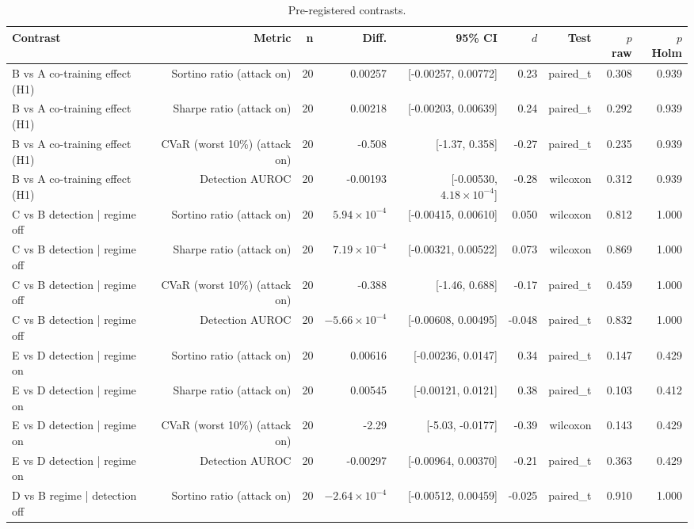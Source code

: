 \begin{table}[htbp]
  \centering
  \caption{Pre-registered contrasts.}
  \label{tab:contrasts}
  \begin{tabular}{lrrrrrrrr}
    \toprule
    Contrast & Metric & n & Diff. & 95\% CI & $d$ & Test & $p$ raw & $p$ Holm \\
    \midrule
    B vs A   co-training effect (H1) & Sortino ratio (attack on) & 20 & 0.00257 & [-0.00257, 0.00772] & 0.23 & paired\_t & 0.308 & 0.939 \\
    B vs A   co-training effect (H1) & Sharpe ratio (attack on) & 20 & 0.00218 & [-0.00203, 0.00639] & 0.24 & paired\_t & 0.292 & 0.939 \\
    B vs A   co-training effect (H1) & CVaR (worst 10\%) (attack on) & 20 & -0.508 & [-1.37, 0.358] & -0.27 & paired\_t & 0.235 & 0.939 \\
    B vs A   co-training effect (H1) & Detection AUROC & 20 & -0.00193 & [-0.00530, $4.18\times10^{-4}$] & -0.28 & wilcoxon & 0.312 & 0.939 \\
    C vs B   detection | regime off & Sortino ratio (attack on) & 20 & $5.94\times10^{-4}$ & [-0.00415, 0.00610] & 0.050 & wilcoxon & 0.812 & 1.000 \\
    C vs B   detection | regime off & Sharpe ratio (attack on) & 20 & $7.19\times10^{-4}$ & [-0.00321, 0.00522] & 0.073 & wilcoxon & 0.869 & 1.000 \\
    C vs B   detection | regime off & CVaR (worst 10\%) (attack on) & 20 & -0.388 & [-1.46, 0.688] & -0.17 & paired\_t & 0.459 & 1.000 \\
    C vs B   detection | regime off & Detection AUROC & 20 & $-5.66\times10^{-4}$ & [-0.00608, 0.00495] & -0.048 & paired\_t & 0.832 & 1.000 \\
    E vs D   detection | regime on & Sortino ratio (attack on) & 20 & 0.00616 & [-0.00236, 0.0147] & 0.34 & paired\_t & 0.147 & 0.429 \\
    E vs D   detection | regime on & Sharpe ratio (attack on) & 20 & 0.00545 & [-0.00121, 0.0121] & 0.38 & paired\_t & 0.103 & 0.412 \\
    E vs D   detection | regime on & CVaR (worst 10\%) (attack on) & 20 & -2.29 & [-5.03, -0.0177] & -0.39 & wilcoxon & 0.143 & 0.429 \\
    E vs D   detection | regime on & Detection AUROC & 20 & -0.00297 & [-0.00964, 0.00370] & -0.21 & paired\_t & 0.363 & 0.429 \\
    D vs B   regime | detection off & Sortino ratio (attack on) & 20 & $-2.64\times10^{-4}$ & [-0.00512, 0.00459] & -0.025 & paired\_t & 0.910 & 1.000 \\

\end{tabular}
\end{table}
